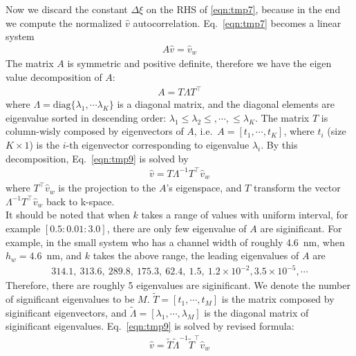 \documentclass[aip,jcp,a4paper,reprint,onecolumn]{revtex4-1}
\newcommand{\diag}{\textrm{diag}}
\begin{document}
\noindent
Now we discard the constant $\Delta \xi$ on the RHS of \eqref{eqn:tmp7}, because in the end we compute the normalized $\hat v$ autocorrelation.
Eq.~\eqref{eqn:tmp7} becomes a linear system
\begin{align}\label{eqn:tmp9}
  A \hat v = \hat v_w
\end{align}
The matrix $A$ is symmetric and positive definite, therefore we have the eigen value decomposition of $A$:
\begin{align}
  A = T \Lambda T^\top
\end{align}
where $\Lambda = \diag\{ \lambda_1, \cdots \lambda_K\}$ is a diagonal matrix,
and the diagonal elements are eigenvalue sorted in descending order:
$\lambda_1 \leq \lambda_2 \leq, \cdots, \leq \lambda_K$.
The matrix $T$ is column-wisly composed by eigenvectors of $A$, i.e.~$A = [t_1, \cdots, t_K]$,
where $t_i$ (size $K\times 1$) is the $i$-th eigenvector corresponding to eigenvalue $\lambda_i$.
By this decomposition, Eq.~\eqref{eqn:tmp9} is solved by
\begin{align}
  \hat v = T \Lambda^{-1} T^\top \hat v_w
\end{align}
where $T^\top \hat v_w$ is the projection to the $A$'s eigenspace, and $T$ transform the vector $\Lambda^{-1} T^\top \hat v_w$ back to  k-space.
\\

\noindent
It should be noted that when $k$ takes a range of values with uniform interval, for example $[0.5 : 0.01: 3.0]$,
there are only few eigenvalue of $A$ are siginificant. For example, in the small system who has a channel width of roughly 4.6~nm,
when $h_w = 4.6$~nm, and $k$ takes the above range, the leading eigenvalues of $A$ are
\begin{align}
  314.1,\ 313.6,\ 289.8,\ 175.3,\ 62.4,\ 1.5,\ 1.2\times10^{-2}, 3.5\times 10^{-5}, \cdots
\end{align}
Therefore, there are roughly 5 eigenvalues are siginificant. We denote the number of significant eigenvalues to be $M$.
$\tilde T = [t_1, \cdots, t_M]$ is the matrix composed by siginificant eigenvectors, and
$\tilde \Lambda = [\lambda_1, \cdots, \lambda_M]$ is the diagonal matrix of siginificant eigenvalues.
Eq.~\eqref{eqn:tmp9} is solved by revised formula:
\begin{align}\label{eqn:solver}
  \hat v = \tilde T \tilde\Lambda^{-1} \tilde T^\top \hat v_w
\end{align}
\end{document}

